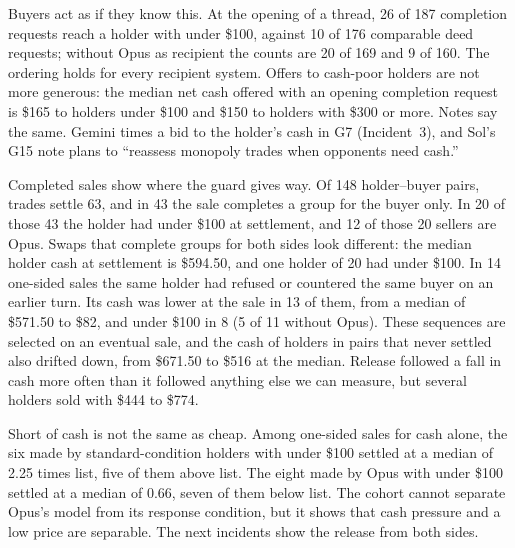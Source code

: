 \documentclass[11pt,letterpaper]{article}
\begin{document}
Buyers act as if they know this. At the opening of a thread, 26 of 187 completion requests reach a holder with under \$100, against 10 of 176 comparable deed requests; without Opus as recipient the counts are 20 of 169 and 9 of 160. The ordering holds for every recipient system. Offers to cash-poor holders are not more generous: the median net cash offered with an opening completion request is \$165 to holders under \$100 and \$150 to holders with \$300 or more. Notes say the same. Gemini times a bid to the holder's cash in G7 (Incident~3), and Sol's G15 note plans to ``reassess monopoly trades when opponents need cash.''

Completed sales show where the guard gives way. Of 148 holder--buyer pairs, trades settle 63, and in 43 the sale completes a group for the buyer only. In 20 of those 43 the holder had under \$100 at settlement, and 12 of those 20 sellers are Opus. Swaps that complete groups for both sides look different: the median holder cash at settlement is \$594.50, and one holder of 20 had under \$100. In 14 one-sided sales the same holder had refused or countered the same buyer on an earlier turn. Its cash was lower at the sale in 13 of them, from a median of \$571.50 to \$82, and under \$100 in 8 (5 of 11 without Opus). These sequences are selected on an eventual sale, and the cash of holders in pairs that never settled also drifted down, from \$671.50 to \$516 at the median. Release followed a fall in cash more often than it followed anything else we can measure, but several holders sold with \$444 to \$774.

Short of cash is not the same as cheap. Among one-sided sales for cash alone, the six made by standard-condition holders with under \$100 settled at a median of 2.25 times list, five of them above list. The eight made by Opus with under \$100 settled at a median of 0.66, seven of them below list. The cohort cannot separate Opus's model from its response condition, but it shows that cash pressure and a low price are separable. The next incidents show the release from both sides.
\end{document}
